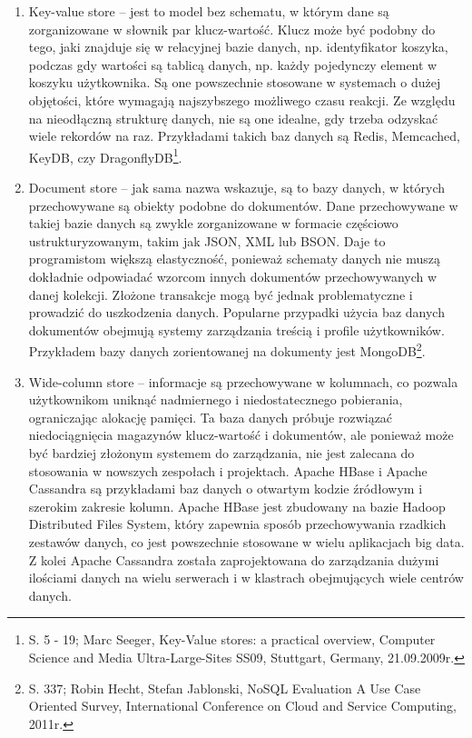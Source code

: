 \documentclass[12pt, a4paper, twoside, openany]{book}
\begin{document}
\begin{enumerate}[label=--]
    \item Key-value store -- jest to model bez schematu, w którym dane są zorganizowane w słownik par klucz-wartość.
    Klucz może być podobny do tego, jaki znajduje się w relacyjnej bazie danych, np. identyfikator koszyka, podczas gdy wartości są tablicą danych, np. każdy pojedynczy element w koszyku użytkownika.
    Są one powszechnie stosowane w systemach o dużej objętości, które wymagają najszybszego możliwego czasu reakcji.
    Ze względu na nieodłączną strukturę danych, nie są one idealne, gdy trzeba odzyskać wiele rekordów na raz.
    Przykładami takich baz danych są Redis, Memcached, KeyDB, czy DragonflyDB\footnote{S. 5 - 19; Marc Seeger, Key-Value stores: a practical overview, Computer Science and Media Ultra-Large-Sites SS09, Stuttgart, Germany, 21.09.2009r.}.
    \item Document store -- jak sama nazwa wskazuje, są to bazy danych, w których przechowywane są obiekty podobne do dokumentów.
    Dane przechowywane w takiej bazie danych są zwykle zorganizowane w formacie częściowo ustrukturyzowanym, takim jak JSON, XML lub BSON.
    Daje to programistom większą elastyczność, ponieważ schematy danych nie muszą dokładnie odpowiadać wzorcom innych dokumentów przechowywanych w danej kolekcji.
    Złożone transakcje mogą być jednak problematyczne i prowadzić do uszkodzenia danych.
    Popularne przypadki użycia baz danych dokumentów obejmują systemy zarządzania treścią i profile użytkowników.
    Przykładem bazy danych zorientowanej na dokumenty jest MongoDB\footnote{S. 337; Robin Hecht, Stefan Jablonski, NoSQL Evaluation A Use Case Oriented Survey, International Conference on Cloud and Service Computing, 2011r.}.
    \item Wide-column store -- informacje są przechowywane w kolumnach, co pozwala użytkownikom uniknąć nadmiernego i niedostatecznego pobierania, ograniczając alokację pamięci.
    Ta baza danych próbuje rozwiązać niedociągnięcia magazynów klucz-wartość i dokumentów, ale ponieważ może być bardziej złożonym systemem do zarządzania, nie jest zalecana do stosowania w nowszych zespołach i projektach.
    Apache HBase i Apache Cassandra są przykładami baz danych o otwartym kodzie źródłowym i szerokim zakresie kolumn.
    Apache HBase jest zbudowany na bazie Hadoop Distributed Files System, który zapewnia sposób przechowywania rzadkich zestawów danych, co jest powszechnie stosowane w wielu aplikacjach big data.
    Z kolei Apache Cassandra została zaprojektowana do zarządzania dużymi ilościami danych na wielu serwerach i w klastrach obejmujących wiele centrów danych.

\end{enumerate}
\end{document}
